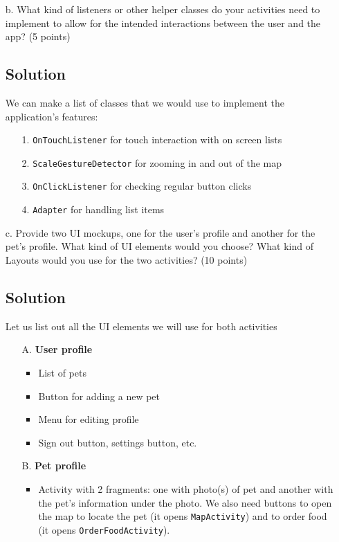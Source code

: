 \documentclass[12pt]{book}
\begin{document}
\begin{itemize}
    \item[b.] What kind of listeners or other helper classes do your activities need to implement to allow for the intended interactions between the user and the app? (5 points)
    
    \subsection*{Solution}
    We can make a list of classes that we would use to implement the application's features:

    \begin{itemize}
        \item[1.] \texttt{OnTouchListener} for touch interaction with on screen lists
        \item[2.] \texttt{ScaleGestureDetector} for zooming in and out of the map
        \item[3.] \texttt{OnClickListener} for checking regular button clicks
        \item[4.] \texttt{Adapter} for handling list items
    \end{itemize}
    

    \item[c.] Provide two UI mockups, one for the user's profile and another for the pet's profile. What kind of UI elements would you choose? What kind of Layouts would you use for the two activities? (10 points)
    
    \subsection*{Solution}

    Let us list out all the UI elements we will use for both activities

    \begin{itemize}
        \item[A.] \textbf{User profile}
        \begin{itemize}
            \item List of pets
            \item Button for adding a new pet
            \item Menu for editing profile
            \item Sign out button, settings button, etc.
        \end{itemize}
        \item[B.] \textbf{Pet profile}
        \begin{itemize}
            \item Activity with 2 fragments: one with photo(s) of pet and another with the pet's information under the photo. We also need buttons to open the map to locate the pet (it opens \texttt{MapActivity}) and to order food (it opens \texttt{OrderFoodActivity}).
        \end{itemize}
    \end{itemize}
    


\end{itemize}
\end{document}
